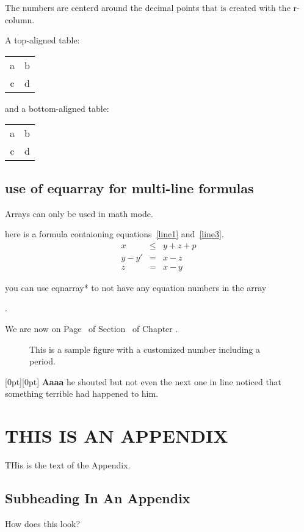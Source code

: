 \documentclass[12pt,twoside,leqno]{article}%
\begin{document}
The numbers are centerd around the decimal points that is created with the r- column.

A top-aligned table:
\begin{tabular}[t]{cc}
a & b \\
c & d
\end{tabular}
and a bottom-aligned table:
\begin{tabular}[b]{cc}
a & b \\
c & d 
\end{tabular}
\subsection{use of equarray for multi-line formulas}
Arrays can only be used in math mode.

here is a formula contaioning equations~\ref{line1} and~\ref{line3}.
\begin{eqnarray}
x& \leq &y+z+p \label{line1}\\
y-y'&=&x-z \nonumber\\
z&=&x-y \label{line3}
\end{eqnarray}

you can use eqnarray* to not have any equation numbers in the array

.

We are now on Page \thepage\ of Section \thesection\ of Chapter \thechapter.

\renewcommand{\thefigure}{\arabic{chapter}.\Alph{figure}}
\setcounter{chapter}{2}
\setcounter{figure}{3}
\begin{figure}[ht]%
\vspace{.5in}
\caption{This is a sample figure with a customized number including a period.}
\end{figure}
\raisebox{0pt}[0pt][0pt]{\large%
\textbf{Aaaa\raisebox{-0.3ex}{a}%
\raisebox{-0.7ex}{aa}%
\raisebox{-1.2ex}{r}%
\raisebox{-2.2ex}{g}%
\raisebox{-4.5ex}{h}}}
he shouted but not even the next one in line noticed that something terrible had happened to him.
\appendix
\section{THIS IS AN APPENDIX}
THis is the text of the Appendix.
\subsection {Subheading In An Appendix}
How does this look?
\end{document}
